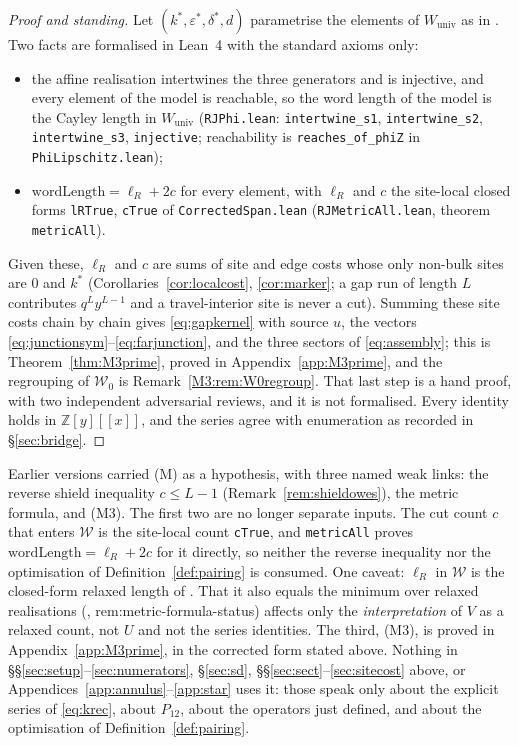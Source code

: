 \documentclass[11pt]{article}
\theoremstyle{plain}
\theoremstyle{definition}
\theoremstyle{remark}
\newcommand{\Z}{\mathbb{Z}}
\begin{document}
\begin{proof}[Proof and standing]
Let $(k^\ast,\varepsilon^\ast,\delta^\ast,d)$ parametrise the elements of $W_{\mathrm{univ}}$ as
in \cite[Theorem ``Normal form and lamp model'', \textup{thm:normal-form}]{Bonfioli2026a}. Two facts
are formalised in Lean~4 with the standard axioms only:
\begin{itemize}
\item the affine realisation intertwines the three generators and is injective, and every element
of the model is reachable, so the word length of the model is the Cayley length in
$W_{\mathrm{univ}}$ (\texttt{RJPhi.lean}: \texttt{intertwine\_s1}, \texttt{intertwine\_s2},
\texttt{intertwine\_s3}, \texttt{injective}; reachability is \texttt{reaches\_of\_phiZ} in
\texttt{PhiLipschitz.lean});
\item $\mathrm{wordLength}=\ell_R+2c$ for every element, with $\ell_R$ and $c$ the site-local
closed forms \texttt{lRTrue}, \texttt{cTrue} of \texttt{CorrectedSpan.lean}
(\texttt{RJMetricAll.lean}, theorem \texttt{metricAll}).
\end{itemize}
Given these, $\ell_R$ and $c$ are sums of site and edge costs whose only non-bulk sites are $0$ and
$k^\ast$ (Corollaries~\ref{cor:localcost}, \ref{cor:marker}; a gap run of length $L$ contributes
$q^Ly^{L-1}$ and a travel-interior site is never a cut). Summing these site costs chain by chain
gives \eqref{eq:gapkernel} with source $u$, the vectors
\eqref{eq:junctionsym}--\eqref{eq:farjunction}, and the three sectors of \eqref{eq:assembly}; this
is Theorem~\ref{thm:M3prime}, proved in Appendix~\ref{app:M3prime}, and the regrouping of
$\mathcal W_0$ is Remark~\ref{M3:rem:W0regroup}. That last step is a hand proof, with two
independent adversarial reviews, and it is not formalised. Every identity holds in
$\Z[y][[x]]$, and the series agree with enumeration as recorded in \S\ref{sec:bridge}.
\end{proof}

\noindent Earlier versions carried \textup{(M)} as a hypothesis, with three named weak links: the
reverse shield inequality $c\le L-1$ (Remark~\ref{rem:shieldowes}), the metric formula, and
\textup{(M3)}. The first two are no longer separate inputs. The cut count $c$ that enters
$\mathcal W$ is the site-local count \texttt{cTrue}, and \texttt{metricAll} proves
$\mathrm{wordLength}=\ell_R+2c$ for it directly, so neither the reverse inequality nor the
optimisation of Definition~\ref{def:pairing} is consumed. One caveat: $\ell_R$ in $\mathcal W$ is the
closed-form relaxed length of \cite{Bonfioli2026a}. That it also equals the minimum over relaxed
realisations (\cite{Bonfioli2026a}, \textup{rem:metric-formula-status}) affects only the
\emph{interpretation} of $V$ as a relaxed count, not $U$ and not the series identities. The third,
\textup{(M3)}, is proved in Appendix~\ref{app:M3prime}, in the corrected form stated above. Nothing in \S\S\ref{sec:setup}--\ref{sec:numerators}, \S\ref{sec:sd},
\S\S\ref{sec:sect}--\ref{sec:sitecost} above, or Appendices~\ref{app:annulus}--\ref{app:star} uses
it: those speak only about the explicit series of \eqref{eq:krec}, about $P_{12}$, about the
operators just defined, and about the optimisation of Definition~\ref{def:pairing}.
\end{document}

